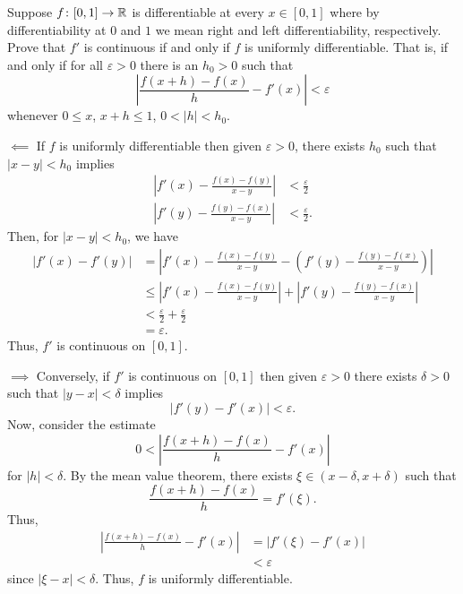 \begin{problem}
  Suppose $f\colon[0,1]\to\mathbb{R}$ is differentiable at every $x\in[0,1]$
  where by differentiability at $0$ and $1$ we mean right and left
  differentiability, respectively. Prove that $f'$ is continuous if and
  only if $f$ is uniformly differentiable. That is, if and only if for all
  $\varepsilon>0$ there is an $h_0>0$ such that
  \[
    \left|\frac{f(x+h)-f(x)}{h}-f'(x)\right|<\varepsilon
  \]
  whenever $0\leq x$, $x+h\leq 1$, $0<|h|<h_0$.
\end{problem}
\begin{solution}
  $\impliedby$ If $f$ is uniformly differentiable then given
  $\varepsilon>0$, there exists $h_0$ such that $|x-y|<h_0$ implies
  \begin{align*}
    \left|
    f'(x)-\frac{f(x)-f(y)}{x-y}
    \right|
    &<\frac{\varepsilon}{2}\\
    \left|
    f'(y)-\frac{f(y)-f(x)}{x-y}
    \right|
    &<\frac{\varepsilon}{2}.
  \end{align*}
  Then, for $|x-y|<h_0$, we have
  \begin{align*}
    |f'(x)-f'(y)|
    &=
      \left|
      f'(x)-\frac{f(x)-f(y)}{x-y}-
      \left(
      f'(y)-
      \frac{f(y)-f(x)}{x-y}
      \right)
      \right|\\
    &\leq
      \left|
      f'(x)-\frac{f(x)-f(y)}{x-y}
      \right|
      +
      \left|
      f'(y)-
      \frac{f(y)-f(x)}{x-y}
      \right|\\
    &<\frac{\varepsilon}{2}+\frac{\varepsilon}{2}\\
    &=\varepsilon.
  \end{align*}
  Thus, $f'$ is continuous on $[0,1]$.

  $\implies$ Conversely, if $f'$ is continuous on $[0,1]$ then given
  $\varepsilon>0$ there exists $\delta>0$ such that $|y-x|<\delta$ implies
  \[
    |f'(y)-f'(x)|<\varepsilon.
  \]
  Now, consider the estimate
  \[
    0<\left|\frac{f(x+h)-f(x)}{h}-f'(x)\right|
  \]
  for $|h|<\delta$. By the mean value theorem, there exists
  $\xi\in(x-\delta,x+\delta)$ such that
  \[
    \frac{f(x+h)-f(x)}{h}=f'(\xi).
  \]
  Thus,
  \begin{align*}
    \left|\frac{f(x+h)-f(x)}{h}-f'(x)\right|
    &=
      \left|f'(\xi)-f'(x)\right|\\
    &<\varepsilon
  \end{align*}
  since $|\xi-x|<\delta$. Thus, $f$ is uniformly differentiable.
\end{solution}

